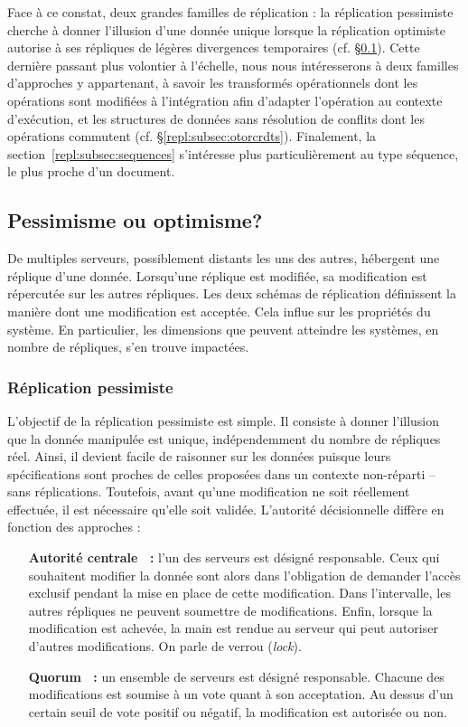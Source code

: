 Face à ce constat, deux grandes familles de réplication : la réplication
pessimiste cherche à donner l'illusion d'une donnée unique lorsque la
réplication optimiste autorise à ses répliques de légères divergences
temporaires (cf. §\ref{repl:subsec:schemas}). Cette dernière passant plus
volontier à l'échelle, nous nous intéresserons à deux familles d'approches y
appartenant, à savoir les transformés opérationnels dont les opérations sont
modifiées à l'intégration afin d'adapter l'opération au contexte d'exécution, et
les structures de données sans résolution de conflits dont les opérations
commutent (cf. §\ref{repl:subsec:otorcrdts}). Finalement, la
section~\ref{repl:subsec:sequences} s'intéresse plus particulièrement au type
séquence, le plus proche d'un document.


\subsection{Pessimisme ou optimisme?}
\label{repl:subsec:schemas}

De multiples serveurs, possiblement distants les uns des autres, hébergent une
réplique d'une donnée. Lorsqu'une réplique est modifiée, sa modification est
répercutée sur les autres répliques. Les deux schémas de réplication définissent
la manière dont une modification est acceptée. Cela influe sur les propriétés du
système. En particulier, les dimensions que peuvent atteindre les systèmes, en
nombre de répliques, s'en trouve impactées.

\subsubsection{Réplication pessimiste}
\label{repl:subsubsec:pessimistic}

L'objectif de la réplication pessimiste est simple. Il consiste à donner
l'illusion que la donnée manipulée est unique, indépendemment du nombre de
répliques réel. Ainsi, il devient facile de raisonner sur les données puisque
leurs spécifications sont proches de celles proposées dans un contexte
non-réparti -- sans réplications.  Toutefois, avant qu'une modification ne soit
réellement effectuée, il est nécessaire qu'elle soit validée. L'autorité
décisionnelle diffère en fonction des approches :
\begin{itemize}
\item [\textbf{Autorité centrale~\cite{alsberg1976principle} :}] l'un des
  serveurs est désigné responsable. Ceux qui souhaitent modifier la donnée sont
  alors dans l'obligation de demander l'accès exclusif pendant la mise en place
  de cette modification. Dans l'intervalle, les autres répliques ne peuvent
  soumettre de modifications. Enfin, lorsque la modification est achevée, la
  main est rendue au serveur qui peut autoriser d'autres modifications. On parle
  de verrou (\emph{lock}).
\item [\textbf{Quorum~\cite{gifford1979weighted} :}] un ensemble de serveurs est
  désigné responsable. Chacune des modifications est soumise à un vote quant à
  son acceptation. Au dessus d'un certain seuil de vote positif ou négatif, la
  modification est autorisée ou non.
\end{itemize}


